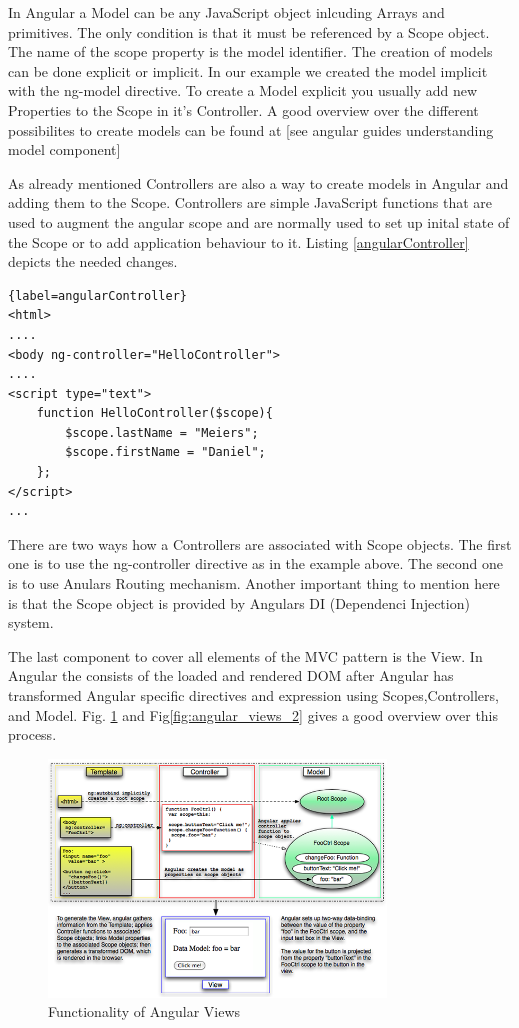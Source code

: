 In Angular a Model can be any JavaScript object inlcuding Arrays and primitives. The only condition is that it must be referenced by a Scope object. The name of the scope property is the model identifier. The creation of models can be done explicit or implicit. In our example we created the model implicit with the ng-model directive. To create a Model explicit you usually add new Properties to the Scope in it's Controller. A good overview over the different possibilites to create models can be found at [see angular guides understanding model component]


As already mentioned Controllers are also a way to create models in Angular and adding them to the Scope. Controllers are simple JavaScript functions that are used to augment the angular scope and are normally used to set up inital state of the Scope or to add application behaviour to it. Listing \ref{angularController} depicts the needed changes.

\begin{lstlisting}{label=angularController}
<html>
....
<body ng-controller="HelloController">
....
<script type="text">
	function HelloController($scope){
	    $scope.lastName = "Meiers";
	    $scope.firstName = "Daniel";
	};
</script>
...
\end{lstlisting}

There are two ways how a Controllers are associated with Scope objects. The first one is to use the ng-controller directive as in the example above. The second one is to use Anulars Routing mechanism. Another important thing to mention here is that the Scope object is provided by Angulars DI (Dependenci Injection) system.   

The last component to cover all elements of the MVC pattern is the View. In Angular the consists of the loaded and rendered DOM after Angular has transformed Angular specific directives and expression using Scopes,Controllers, and Model. Fig. \ref{fig:angular_views} and Fig\ref{fig:angular_views_2} gives a good overview over this process.
  
\begin{figure}
	\centering	
	\includegraphics[width=0.8\textwidth]{./img/angular_view.png}
	\caption{Functionality of Angular Views}
	\label{fig:angular_views}
\end{figure} 

